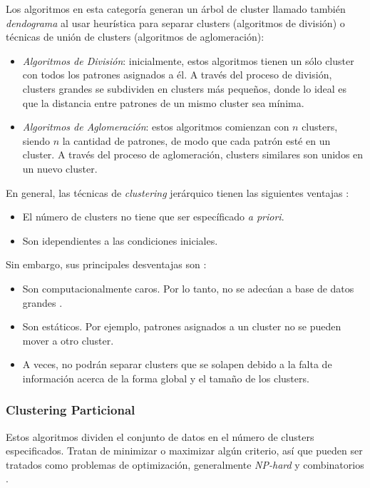 Los algoritmos en esta categoría generan
un árbol de cluster llamado también \emph{dendograma} al usar heurística para
separar clusters (algoritmos de división) o técnicas de unión de clusters
(algoritmos de aglomeración):
    \begin{itemize}
        \item \emph{Algoritmos de División}: inicialmente, estos algoritmos
tienen un sólo cluster con todos los patrones asignados a él. A través del
proceso de división, clusters grandes se subdividen en clusters más pequeños,
donde lo ideal es que la distancia entre patrones de un mismo cluster sea
mínima.
        \item \emph{Algoritmos de Aglomeración}: estos algoritmos comienzan con
$n$ clusters, siendo $n$ la cantidad de patrones, de modo que cada patrón esté
en un cluster. A través del proceso de aglomeración, clusters similares son
unidos en un nuevo cluster.
    \end{itemize}
    En general, las técnicas de \emph{clustering} jerárquico tienen las siguientes
ventajas \cite{PSO_0}:
    \begin{itemize}
        \item El número de clusters no tiene que ser específicado \emph{a priori}.
        \item Son idependientes a las condiciones iniciales.
    \end{itemize}
    Sin embargo, sus principales desventajas son \cite{PSO_0}:
    \begin{itemize}
        \item Son computacionalmente caros. Por lo tanto, no se adecúan a base
de datos grandes \cite{DC_2}.
        \item Son estáticos. Por ejemplo, patrones asignados a un cluster no se
pueden mover a otro cluster.
        \item A veces, no podrán separar clusters que se solapen debido a la
falta de información acerca de la forma global y el tamaño de los clusters.
    \end{itemize}

\subsubsection{Clustering Particional}

    Estos algoritmos dividen el conjunto
de datos en el número de clusters especificados. Tratan de minimizar o maximizar
algún criterio, así que pueden ser tratados como problemas de optimización,
generalmente \emph{NP-hard} y combinatorios \cite{DC_3}.

